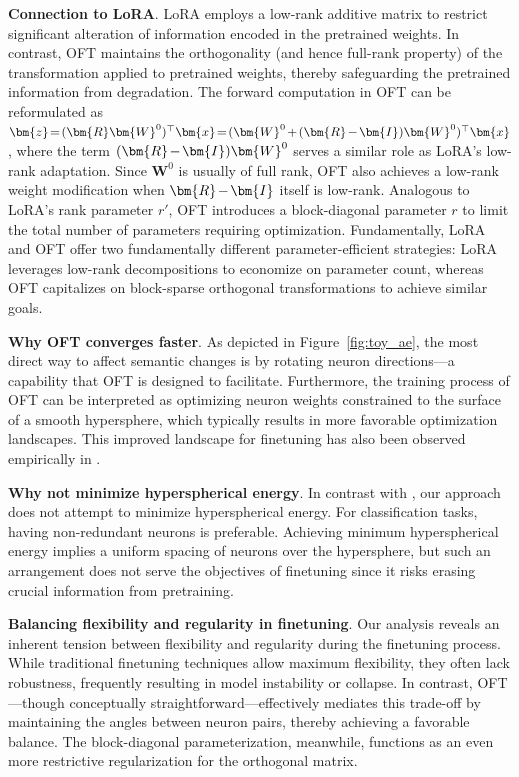 \textbf{Connection to LoRA}. LoRA employs a low-rank additive matrix to restrict significant alteration of information encoded in the pretrained weights. In contrast, OFT maintains the orthogonality (and hence full-rank property) of the transformation applied to pretrained weights, thereby safeguarding the pretrained information from degradation. The forward computation in OFT can be reformulated as $\thickmuskip=2mu \medmuskip=2mu \bm{z}=(\bm{R}\bm{W}^0)^\top\bm{x}=(\bm{W}^0+(\bm{R}-\bm{I})\bm{W}^0)^\top\bm{x}$, where the term $\thickmuskip=2mu \medmuskip=2mu (\bm{R}-\bm{I})\bm{W}^0$ serves a similar role as LoRA’s low-rank adaptation. Since $\bm{W}^0$ is usually of full rank, OFT also achieves a low-rank weight modification when $\thickmuskip=2mu \medmuskip=2mu \bm{R}-\bm{I}$ itself is low-rank. Analogous to LoRA’s rank parameter $r'$, OFT introduces a block-diagonal parameter $r$ to limit the total number of parameters requiring optimization. Fundamentally, LoRA and OFT offer two fundamentally different parameter-efficient strategies: LoRA leverages low-rank decompositions to economize on parameter count, whereas OFT capitalizes on block-sparse orthogonal transformations to achieve similar goals.

\textbf{Why OFT converges faster}. As depicted in Figure~\ref{fig:toy_ae}, the most direct way to affect semantic changes is by rotating neuron directions—a capability that OFT is designed to facilitate. Furthermore, the training process of OFT can be interpreted as optimizing neuron weights constrained to the surface of a smooth hypersphere, which typically results in more favorable optimization landscapes. This improved landscape for finetuning has also been observed empirically in \cite{liu2021orthogonal}.

\textbf{Why not minimize hyperspherical energy}. In contrast with \cite{liu2021orthogonal}, our approach does not attempt to minimize hyperspherical energy. For classification tasks, having non-redundant neurons is preferable. Achieving minimum hyperspherical energy implies a uniform spacing of neurons over the hypersphere, but such an arrangement does not serve the objectives of finetuning since it risks erasing crucial information from pretraining.

\textbf{Balancing flexibility and regularity in finetuning}. Our analysis reveals an inherent tension between flexibility and regularity during the finetuning process. While traditional finetuning techniques allow maximum flexibility, they often lack robustness, frequently resulting in model instability or collapse. In contrast, OFT—though conceptually straightforward—effectively mediates this trade-off by maintaining the angles between neuron pairs, thereby achieving a favorable balance. The block-diagonal parameterization, meanwhile, functions as an even more restrictive regularization for the orthogonal matrix.

